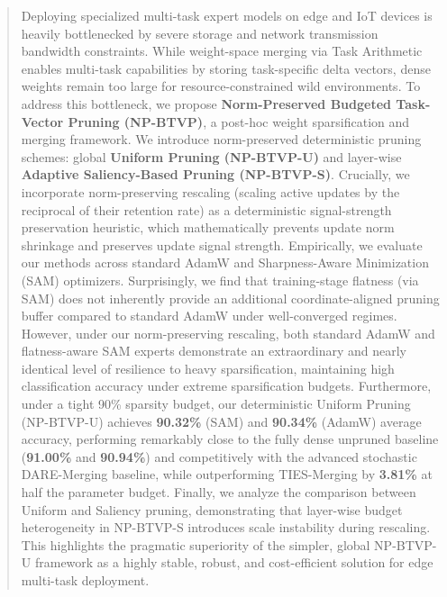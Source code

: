 \begin{abstract}
Deploying specialized multi-task expert models on edge and IoT devices is heavily bottlenecked by severe storage and network transmission bandwidth constraints. While weight-space merging via Task Arithmetic enables multi-task capabilities by storing task-specific delta vectors, dense weights remain too large for resource-constrained wild environments. To address this bottleneck, we propose \textbf{Norm-Preserved Budgeted Task-Vector Pruning (NP-BTVP)}, a post-hoc weight sparsification and merging framework. We introduce norm-preserved deterministic pruning schemes: global \textbf{Uniform Pruning (NP-BTVP-U)} and layer-wise \textbf{Adaptive Saliency-Based Pruning (NP-BTVP-S)}. Crucially, we incorporate norm-preserving rescaling (scaling active updates by the reciprocal of their retention rate) as a deterministic signal-strength preservation heuristic, which mathematically prevents update norm shrinkage and preserves update signal strength. Empirically, we evaluate our methods across standard AdamW and Sharpness-Aware Minimization (SAM) optimizers. Surprisingly, we find that training-stage flatness (via SAM) does not inherently provide an additional coordinate-aligned pruning buffer compared to standard AdamW under well-converged regimes. However, under our norm-preserving rescaling, both standard AdamW and flatness-aware SAM experts demonstrate an extraordinary and nearly identical level of resilience to heavy sparsification, maintaining high classification accuracy under extreme sparsification budgets. Furthermore, under a tight 90\% sparsity budget, our deterministic Uniform Pruning (NP-BTVP-U) achieves \textbf{90.32\%} (SAM) and \textbf{90.34\%} (AdamW) average accuracy, performing remarkably close to the fully dense unpruned baseline (\textbf{91.00\%} and \textbf{90.94\%}) and competitively with the advanced stochastic DARE-Merging baseline, while outperforming TIES-Merging by \textbf{3.81\%} at half the parameter budget. Finally, we analyze the comparison between Uniform and Saliency pruning, demonstrating that layer-wise budget heterogeneity in NP-BTVP-S introduces scale instability during rescaling. This highlights the pragmatic superiority of the simpler, global NP-BTVP-U framework as a highly stable, robust, and cost-efficient solution for edge multi-task deployment.
\end{abstract}